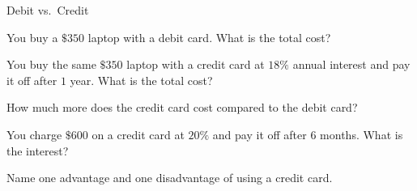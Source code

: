 \begin{practiceBox}{Debit vs.\ Credit}

\prob You buy a $\$350$ laptop with a debit card. What is the total cost? \answerBlank[3cm]

\prob You buy the same $\$350$ laptop with a credit card at $18\%$ annual interest and pay it off after $1$ year. What is the total cost? \answerBlank[3cm]

\prob How much more does the credit card cost compared to the debit card? \answerBlank[3cm]

\prob You charge $\$600$ on a credit card at $20\%$ and pay it off after $6$ months. What is the interest? \answerBlank[3cm]

\prob Name one advantage and one disadvantage of using a credit card. \answerBlank[5cm]
\end{practiceBox}

